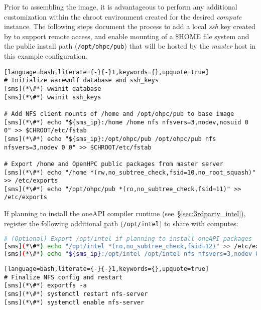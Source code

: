 Prior to assembling the image, it is advantageous to perform any additional
customization within the chroot environment created for the desired {\em
 compute} instance. The following steps document the process to add a local
{\em ssh} key created by \Warewulf{} to support remote access, 
and enable \NFS{}
mounting of a \$HOME file system and the public \OHPC{} install path
(\texttt{/opt/ohpc/pub}) that will be hosted by the {\em master} host in this
example configuration.

\vspace*{0.15cm}
\else
\vspace*{0.15cm}
\fi

\begin{lstlisting}[language=bash,literate={-}{-}1,keywords={},upquote=true]
# Initialize warewulf database and ssh_keys
[sms](*\#*) wwinit database
[sms](*\#*) wwinit ssh_keys

# Add NFS client mounts of /home and /opt/ohpc/pub to base image
[sms](*\#*) echo "${sms_ip}:/home /home nfs nfsvers=3,nodev,nosuid 0 0" >> $CHROOT/etc/fstab
[sms](*\#*) echo "${sms_ip}:/opt/ohpc/pub /opt/ohpc/pub nfs nfsvers=3,nodev 0 0" >> $CHROOT/etc/fstab

# Export /home and OpenHPC public packages from master server
[sms](*\#*) echo "/home *(rw,no_subtree_check,fsid=10,no_root_squash)" >> /etc/exports
[sms](*\#*) echo "/opt/ohpc/pub *(ro,no_subtree_check,fsid=11)" >> /etc/exports
\end{lstlisting}

\noindent If planning to install the \IntelR{} oneAPI compiler runtime
(see~\S\ref{sec:3rdparty_intel}), register the
following additional path (\texttt{/opt/intel}) to share with computes:

\begin{lstlisting}[language=bash,keywords={},upquote=true,keepspaces]
# (Optional) Export /opt/intel if planning to install oneAPI packages
[sms](*\#*) echo "/opt/intel *(ro,no_subtree_check,fsid=12)" >> /etc/exports
[sms](*\#*) echo "${sms_ip}:/opt/intel /opt/intel nfs nfsvers=3,nodev 0 0" >> $CHROOT/etc/fstab
\end{lstlisting}
\begin{lstlisting}[language=bash,literate={-}{-}1,keywords={},upquote=true]
# Finalize NFS config and restart
[sms](*\#*) exportfs -a
[sms](*\#*) systemctl restart nfs-server
[sms](*\#*) systemctl enable nfs-server
\end{lstlisting}

